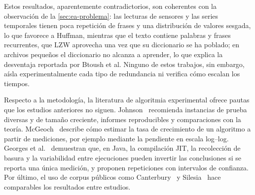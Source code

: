 Estos resultados, aparentemente contradictorios, son coherentes con la observación de la
\cref{sec:ea-problema}: las lecturas de sensores y las series temporales tienen poca
repetición de frases y una distribución de valores sesgada, lo que favorece a Huffman,
mientras que el texto contiene palabras y frases recurrentes, que LZW aprovecha una vez que su
diccionario se ha poblado; en archivos pequeños el diccionario no alcanza a aprender, lo que
explica la desventaja reportada por Btoush et al. Ninguno de estos trabajos, sin embargo,
aísla experimentalmente cada tipo de redundancia ni verifica cómo escalan los tiempos.

Respecto a la metodología, la literatura de algoritmia experimental ofrece pautas que los
estudios anteriores no siguen. Johnson~\cite{johnson2002} recomienda instancias de prueba
diversas y de tamaño creciente, informes reproducibles y comparaciones con la teoría.
McGeoch~\cite{mcgeoch2012} describe cómo estimar la tasa de crecimiento de un algoritmo a
partir de mediciones, por ejemplo mediante la pendiente en escala log--log. Georges et
al.~\cite{georges2007} demuestran que, en Java, la compilación JIT, la recolección de basura y
la variabilidad entre ejecuciones pueden invertir las conclusiones si se reporta una única
medición, y proponen repeticiones con intervalos de confianza. Por último, el uso de corpus
públicos como Canterbury~\cite{arnold1997} y Silesia~\cite{deorowicz2003} hace comparables los
resultados entre estudios.


